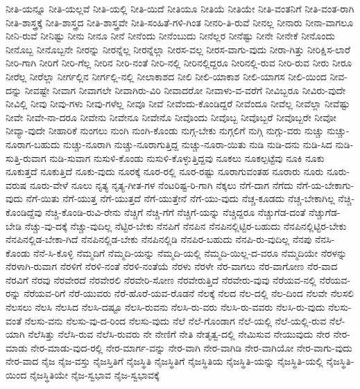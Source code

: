 {ನೀತಿ-ಯನ್ನೂ
ನೀತಿ-ಯಲ್ಲವೆ
ನೀತಿ-ಯಲ್ಲಿ
ನೀತಿ-ಯಿದೆ
ನೀತಿಯೂ
ನೀತಿಯೆ
ನೀತಿಯೇ
ನೀತಿ-ವಂತನಿಗೆ
ನೀತಿ-ವಂತ-ರಾಗಿ
ನೀತಿ-ಶಾಸ್ತ್ರಕ್ಕೆ
ನೀತಿ-ಶಾಸ್ತ್ರದ
ನೀತಿ-ಶಾಸ್ತ್ರವೇ
ನೀತಿ-ಸಂಹಿತೆ-ಗಳಿ-ಗಿಂತ
ನೀನರಿ-ತಿ-ರುವೆ
ನೀನಲ್ಲ
ನೀನಾರು
ನೀನಾ-ವಾಗಲೂ
ನೀನಿ-ರುವೆ
ನೀನಿಷ್ಟು
ನೀನು
ನೀನೂ
ನೀನೆ
ನೀನೆಂದು
ನೀನೆಂಬುದು
ನೀನೆಲ್ಲರ
ನೀನೆಷ್ಟು
ನೀನೇ
ನೀನೇಕೆ
ನೀನೊಂದು
ನೀನೊಬ್ಬ
ನೀನೊಬ್ಬನೇ
ನೀರನ್ನು
ನೀರನ್ನೆಲ್ಲ
ನೀರನ್ನೆಲ್ಲಾ
ನೀರಸ-ವಲ್ಲ
ನೀರಸ-ವಾಗು-ವುದು
ನೀರಾ-ಗಿತ್ತು
ನೀರಿಕ್ಷಿಸ-ಲಾರೆ
ನೀರಿ-ಗಾಗಿ
ನೀರಿಗೆ
ನೀರಿ-ಗೆಲ್ಲ
ನೀರಿನ
ನೀರಿ-ನಂತೆ
ನೀರಿ-ನಲ್ಲಿ
ನೀರಿನಲ್ಲಿದ್ದರೂ
ನೀರಿನಲ್ಲಿ-ರುವ
ನೀರಿ-ರುವ
ನೀರು
ನೀರೂ
ನೀರೆಲ್ಲ
ನೀರೆಲ್ಲಾ
ನೀರ್ಗಲ್ಲಿನ
ನೀರ್ಗಲ್ಲಿ-ನಲ್ಲಿ
ನೀಲಾಕಾಶದ
ನೀಲಿ
ನೀಲಿ-ಯಾಕಾಶ
ನೀಲಿ-ಯಾಗಸ
ನೀಲಿ-ಯಿಂದ
ನೀವ-ದನ್ನು
ನೀವಷ್ಟೇ
ನೀವಾಗ
ನೀವಾಗಲೇ
ನೀವಾಗಿರು-ವಿರಿ
ನೀವಾದರೋ
ನೀವಾಳು-ವ-ವರೆಗೆ
ನೀವಿಬ್ಬರೂ
ನೀವಿರು-ವುದೇ
ನೀವಿಲ್ಲಿ
ನೀವು
ನೀವು-ಗಳು
ನೀವು-ಗಳೆಲ್ಲ
ನೀವೂ
ನೀವೆ
ನೀವೆಂದು-ಕೊಂಡಿದ್ದರೆ
ನೀವೆಂದೂ
ನೀವೆಲ್ಲ
ನೀವೆಲ್ಲಾ
ನೀವೆಷ್ಟು
ನೀವೇ
ನೀವೇ-ನಾ-ದರೂ
ನೀವೇನು
ನೀವೇನೂ
ನೀವೇನೊ
ನೀವೊಂದು
ನೀವೊಬ್ಬ
ನೀವೊಬ್ಬರೆ
ನೀವೊಬ್ಬರೇ
ನೀವೋ
ನೀವ್ಯಾ-ವುದೇ
ನೀಹಾರಿಕೆ
ನುಂಗಲು
ನುಂಗಿ
ನುಂಗಿ-ಕೊಂಡು
ನುಗ್ಗ-ಬೇಕು
ನುಗ್ಗಲಿಗೆ
ನುಗ್ಗಿ
ನುಗ್ಗು-ವರು
ನುಚ್ಚು
ನುಚ್ಚು-ನೂರಾಗ-ಬಹುದು
ನುಚ್ಚು-ನೂರಾಗಿ
ನುಚ್ಚು-ನೂರಾಗುತ್ತಿದ್ದ
ನುಚ್ಚು-ನೂರಾ-ಯಿತು
ನುಡಿ
ನುಡಿ-ದನು
ನುಡಿ-ಸಿದ
ನುಡಿ-ಸುತ್ತಿ-ರುವಾಗ
ನುಡಿ-ಸುವಾಗ
ನುಸುಳಿ-ಕೊಂಡು
ನುಸುಳಿ-ಕೊಳ್ಳುತ್ತಿದ್ದವು
ನೂಕಲು
ನೂಕಲ್ಪಟ್ಟೆವು
ನೂಕಿ
ನೂಕು
ನೂಕುತ್ತದೆ
ನೂಕುತ್ತಿದೆ
ನೂಕು-ವುದು
ನೂರಕ್ಕೆ
ನೂರ-ರಲ್ಲಿ
ನೂರ-ರಷ್ಟು
ನೂರಾಗುವಂತಹ
ನೂರಾರು
ನೂರು
ನೂರು-ವರುಷ
ನೂರು-ವೇಳೆ
ನೂಲು
ನೃತ್ಯ
ನೃತ್ಯ-ಗೀತ-ಗಳ
ನೆಂಟರಿಷ್ಟ-ರಿ-ಗಾಗಿ
ನೆಕ್ಕಲು
ನೆಗೆ-ದಾಗ
ನೆಗೆದು
ನೆಗೆ-ಯ-ಬೇಕಾಗು-ವುದು
ನೆಗೆ-ಯಿತು
ನೆಗೆ-ಯುತ್ತ
ನೆಗೆ-ಯುತ್ತದೆ
ನೆಗೆ-ಯುತ್ತೇನೆ
ನೆಗೆ-ಯು-ವುದು
ನೆಚ್ಚ-ಕೂಡದು
ನೆಚ್ಚ-ಬೇಕಾಗಿಲ್ಲ
ನೆಚ್ಚಿ-ಕೊಂಡಿದ್ದೆವು
ನೆಚ್ಚಿ-ಕೊಂಡಿ-ರುವಿ-ರೇನು
ನೆಚ್ಚಿಗೆ
ನೆಚ್ಚಿ-ಗೆಗೆ
ನೆಚ್ಚಿಗೆ-ಯನ್ನು
ನೆಚ್ಚಿದ್ದರೂ
ನೆಚ್ಚುಗೆಡ-ದಂತೆ
ನೆಚ್ಚುಗೆಡ-ಬೇಡಿ
ನೆಚ್ಚು-ವು-ದಕ್ಕೆ
ನೆಚ್ಚು-ವುದಿಲ್ಲ
ನೆಟ್ಟಿರ-ಬೇಕು
ನೆನಪಿಗೆ
ನೆನಪಿನ
ನೆನಪಿನಲ್ಲಿಟ್ಟಿರ-ಬಹುದು
ನೆನಪಿನಲ್ಲಿಟ್ಟಿರ-ಬೇಕು
ನೆನಪಿನಲ್ಲಿಡ-ಬೇಕಾ-ಗಿದೆ
ನೆನಪಿನಲ್ಲಿಡ-ಬೇಕು
ನೆನಪಿನಲ್ಲಿಡಿ
ನೆನಪಿರ-ಬಹುದು
ನೆನಪಿ-ರು-ವುದಿಲ್ಲ
ನೆನಪು
ನೆನಸಿ-ಕೊಂಡು
ನೆನೆ-ಸಿ-ಕೊಳ್ಳಿ
ನೆಮ್ಮದಿಗೆ
ನೆಮ್ಮದಿ-ಯನ್ನು
ನೆಮ್ಮದಿ-ಯಲ್ಲಿ
ನೆಮ್ಮದಿ-ಯಿಲ್ಲ-ದ-ವರೂ
ನೆಮ್ಮದಿಯೇ
ನೆರಳನ್ನು
ನೆರಳಾಗಿ-ರುವಾಗ
ನೆರಳಿಗೆ
ನೆರಳಿ-ನಂತೆ
ನೆರಳಿ-ನಂತೆಯೆ
ನೆರಳು
ನೆರಳೇ
ನೆರ-ವಾಗಲು
ನೆರ-ವಾಗೋಣ
ನೆರ-ವಾದ
ನೆರವಿಗೆ
ನೆರವು
ನೆರವೇರದೆ
ನೆರವೇರಲಿ
ನೆರವೇರಿ-ಸೋಣ
ನೆರವೇರುತ್ತಿದೆ
ನೆರವೇರು-ವುವು
ನೆರೆಯವ-ನಲ್ಲಿ
ನೆರೆಯವ-ರನ್ನು
ನೆರೆಯವ-ರಿಗೆ
ನೆರೆ-ಯುವರು
ನೆರೆ-ಹೊರೆ-ಯವ-ರೊಡನೆ
ನೆಲಕ್ಕೆ
ನೆಲದ
ನೆಲ-ದಲ್ಲಿ
ನೆಲ-ದಿಂದ
ನೆಲವೇ
ನೆಲಸಲಿ
ನೆಲಸಲು
ನೆಲಸಿ
ನೆಲಸಿದ
ನೆಲಸಿ-ದಷ್ಟೂ
ನೆಲಸಿ-ರುವನು
ನೆಲಸಿ-ರು-ವರು
ನೆಲಸಿ-ರು-ವವರು
ನೆಲಸಿ-ರು-ವುದು
ನೆಲಸು-ವಂತೆ
ನೆಲಸು-ವನು
ನೆಲಸು-ವು-ದ-ರಿಂದ
ನೆಲಸು-ವುದು
ನೆಲೆ
ನೆಲೆ-ಗೊಂಡಾಗ
ನೆಲೆ-ಯಲ್ಲಿ
ನೆಲೆ-ಯಲ್ಲಿ-ರುವ
ನೆಲೆ-ಯಾಗಿ
ನೆಲೆಸಿತ್ತು
ನೆಲೆಸಿ-ರುವ
ನೆಲೆಸಿ-ರುವರು
ನೇ
ನೇಣಿಗೆ
ನೇತಿ
ನೇತೃತ್ವ-ದಲ್ಲಿ
ನೇಮಿಸುವ
ನೇಯುವುದು
ನೇರ
ನೇರ-ಮಾಡು
ನೇರ-ಮಾಡು-ವುದ-ರಲ್ಲಿ
ನೇರ-ಮಾರ್ಗ-ವನ್ನು
ನೇರ-ವಾಗಿ
ನೇರ-ವಾಗಿಡಿ
ನೇರ-ವಾಗಿಯೋ
ನೇರ-ವಾಗು-ವುದು
ನೇರ-ವಾದ
ನೈಜ
ನೈಜ-ವಸ್ತು
ನೈಜಸ್ತಿತಿಗೆ
ನೈಜಸ್ಥಿತಿ
ನೈಜಸ್ಥಿತಿಗೆ
ನೈಜಸ್ಥಿತಿಯ
ನೈಜಸ್ಥಿತಿ-ಯನ್ನು
ನೈಜಸ್ಥಿತಿ-ಯಲ್ಲಿ
ನೈಜಸ್ಥಿತಿ-ಯಿಂದ
ನೈಜಸ್ಥಿತಿಯೇ
ನೈಜ-ಸ್ವಭಾವ
ನೈಜ-ಸ್ವಭಾವಕ್ಕೆ
}
